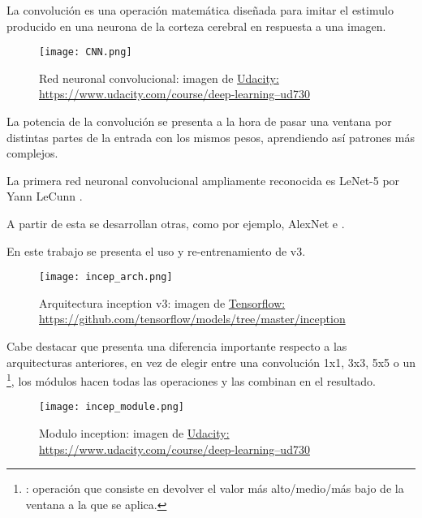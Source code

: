 La convolución es una operación matemática diseñada para imitar el estimulo producido en una neurona de la corteza cerebral en respuesta a una imagen.


\begin{figure}
	\centering
	\texttt{[image: CNN.png]}
	\caption[Red neuronal convolucional]{Red neuronal convolucional: imagen de \href{https://www.udacity.com/course/deep-learning--ud730}{Udacity: https://www.udacity.com/course/deep-learning--ud730}}\label{fig:CNN.png}
\end{figure}
\FloatBarrier
La potencia de la convolución se presenta a la hora de pasar una ventana por distintas partes de la entrada con los mismos pesos, aprendiendo así patrones más complejos.

La primera red neuronal convolucional ampliamente reconocida es LeNet-5 por Yann LeCunn \cite{lecun98}. 

A partir de esta se desarrollan otras, como por ejemplo, AlexNet\cite{alexnet} e \cite{incep}.

En este trabajo se presenta el uso y re-entrenamiento de  v3.

\begin{figure}
	\centering
	\texttt{[image: incep\_arch.png]}
	\caption[Arquitectura inception v3]{Arquitectura inception v3: imagen de \href{https://github.com/tensorflow/models/tree/master/inception}{Tensorflow: https://github.com/tensorflow/models/tree/master/inception}}\label{fig:incep_arch.png}
\end{figure}
\FloatBarrier
Cabe destacar que  presenta una diferencia importante respecto a las arquitecturas anteriores, en vez de elegir entre una convolución 1x1, 3x3, 5x5 o un \footnote{: operación que consiste en devolver el valor más alto/medio/más bajo de la ventana a la que se aplica.}, los módulos  hacen todas las operaciones y las combinan en el resultado.

\begin{figure}
	\centering
	\texttt{[image: incep\_module.png]}
	\caption[Módulo inception]{Modulo inception: imagen de \href{https://www.udacity.com/course/deep-learning--ud730}{Udacity: https://www.udacity.com/course/deep-learning--ud730}}\label{fig:incep_module.png}
\end{figure}









